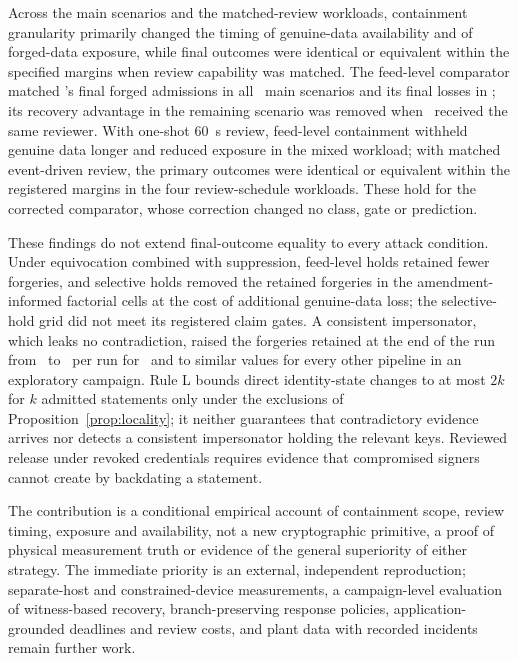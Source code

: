Across the main scenarios and the matched-review workloads, containment granularity primarily changed the timing of genuine-data availability and of forged-data exposure, while final outcomes were identical or equivalent within the specified margins when review capability was matched. The feed-level comparator matched \sys's final forged admissions in all \VPOneIdentical\ main scenarios and its final losses in \VOTwoBFiveIdentical; its recovery advantage in the remaining scenario was removed when \sys\ received the same reviewer. With one-shot 60~s review, feed-level containment withheld genuine data longer and reduced exposure in the mixed workload; with matched event-driven review, the primary outcomes were identical or equivalent within the registered margins in the four review-schedule workloads. These hold for the corrected comparator, whose correction changed no class, gate or prediction.

These findings do not extend final-outcome equality to every attack condition. Under equivocation combined with suppression, feed-level holds retained fewer forgeries, and selective holds removed the retained forgeries in the amendment-informed factorial cells at the cost of additional genuine-data loss; the selective-hold grid did not meet its registered claim gates. A consistent impersonator, which leaks no contradiction, raised the forgeries retained at the end of the run from \YEfourRegPBTIOOne\ to \YEfourConPBTIOOne\ per run for \sys\ and to similar values for every other pipeline in an exploratory campaign. Rule L bounds direct identity-state changes to at most $2k$ for $k$ admitted statements only under the exclusions of Proposition~\ref{prop:locality}; it neither guarantees that contradictory evidence arrives nor detects a consistent impersonator holding the relevant keys. Reviewed release under revoked credentials requires evidence that compromised signers cannot create by backdating a statement.

The contribution is a conditional empirical account of containment scope, review timing, exposure and availability, not a new cryptographic primitive, a proof of physical measurement truth or evidence of the general superiority of either strategy. The immediate priority is an external, independent reproduction; separate-host and constrained-device measurements, a campaign-level evaluation of witness-based recovery, branch-preserving response policies, application-grounded deadlines and review costs, and plant data with recorded incidents remain further work.


